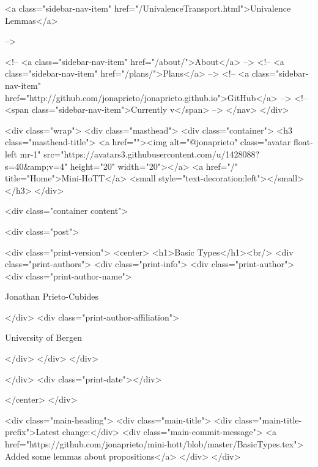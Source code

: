      
    
      
        
          <a class="sidebar-nav-item" href="/UnivalenceTransport.html">Univalence Lemmas</a>
        
      
     -->

    <!-- <a class="sidebar-nav-item" href="/about/">About</a> -->
    <!-- <a class="sidebar-nav-item" href="/plans/">Plans</a> -->
    <!-- <a class="sidebar-nav-item" href="http://github.com/jonaprieto/jonaprieto.github.io">GitHub</a> -->
    <!-- <span class="sidebar-nav-item">Currently v</span> -->
  </nav>
</div>

    <div class="wrap">
      <div class="masthead">
        <div class="container">
          <h3 class="masthead-title">
            <a href=""><img alt="@jonaprieto" class="avatar float-left mr-1" src="https://avatars3.githubusercontent.com/u/1428088?s=40&amp;v=4" height="20" width="20"></a>
            <a href="/" title="Home">Mini-HoTT</a>
            <small style="text-decoration:left"></small>
          </h3>
        </div>
      
      <div class="container content">
        







<div class="post">

  <div class="print-version">
    <center>
      <h1>Basic Types</h1><br/>
        <div class="print-authors">
          <div class="print-info">
            <div class="print-author">
              <div class="print-author-name">
                
                  Jonathan Prieto-Cubides
                
              </div>
              <div class="print-author-affiliation">
                
                  University of Bergen
                
                </div>
            </div>
          </div>
          
          
        </div>
        <div class="print-date"></div>
        
        
    </center>
  </div>

  
  <div class="main-heading">
    <div class="main-title">
      <div class="main-title-prefix">Latest change:</div>
      <div class="main-commit-message">
            <a href="https://github.com/jonaprieto/mini-hott/blob/master/BasicTypes.tex">
              Added some lemmas about propositions</a>
      </div>
    </div>

